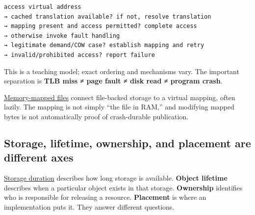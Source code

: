 \begin{verbatim}
access virtual address
→ cached translation available? if not, resolve translation
→ mapping present and access permitted? complete access
→ otherwise invoke fault handling
→ legitimate demand/COW case? establish mapping and retry
→ invalid/prohibited access? report failure
\end{verbatim}

This is a teaching model; exact ordering and mechanisms vary. The important separation is \textbf{TLB miss ≠ page fault ≠ disk read ≠ program crash}.

\hyperref[appendix-313ee7a0ba7b]{Memory-mapped files} connect file-backed storage to a virtual mapping, often lazily. The mapping is not simply ``the file in RAM,'' and modifying mapped bytes is not automatically proof of crash-durable publication.

\subsection{Storage, lifetime, ownership, and placement are different axes}\label{05-engine-i-ch002-storage-lifetime-ownership-and-placement-are-different-axes}

\hyperref[appendix-0b104bcba06b]{Storage duration} describes how long storage is available. \textbf{Object lifetime} describes when a particular object exists in that storage. \textbf{Ownership} identifies who is responsible for releasing a resource. \textbf{Placement} is where an implementation puts it. They answer different questions.

